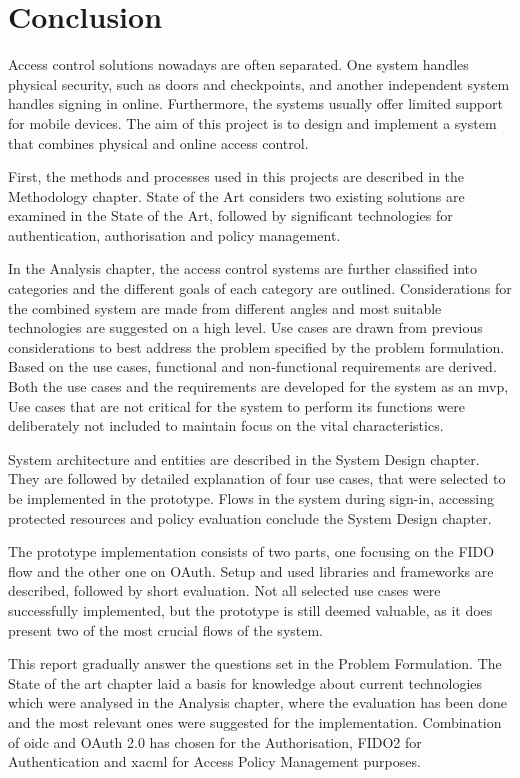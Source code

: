 \section{Conclusion}\label{sec:conclusion}

Access control solutions nowadays are often separated. One system handles physical security, such as doors and checkpoints, and another independent system handles signing in online. Furthermore, the systems usually offer limited support for mobile devices. The aim of this project is to design and implement a system that combines physical and online access control.

First, the methods and processes used in this projects are described in the Methodology chapter. State of the Art considers two existing solutions are examined in the State of the Art, followed by significant technologies for authentication, authorisation and policy management. 

In the Analysis chapter, the access control systems are further classified into categories and the different goals of each category are outlined. Considerations for the combined system are made from different angles and most suitable technologies are suggested on a high level. Use cases are drawn from previous considerations to best address the problem specified by the problem formulation. Based on the use cases, functional and non-functional requirements are derived. Both the use cases and the requirements are developed for the system as an \acrshort{mvp}, Use cases that are not critical for the system to perform its functions were deliberately not included to maintain focus on the vital characteristics.

System architecture and entities are described in the System Design chapter. They are followed by detailed explanation of four use cases, that were selected to be implemented in the prototype. Flows in the system during sign-in, accessing protected resources and policy evaluation conclude the System Design chapter.

The prototype implementation consists of two parts, one focusing on the FIDO flow and the other one on OAuth. Setup and used libraries and frameworks are described, followed by short evaluation. Not all selected use cases were successfully implemented, but the prototype is still deemed valuable, as it does present two of the most crucial flows of the system. 

This report gradually answer the questions set in the Problem Formulation. The State of the art chapter laid a basis for knowledge about current technologies which were analysed in the Analysis chapter, where the evaluation has been done and the most relevant ones were suggested for the implementation. Combination of \acrlong{oidc} and OAuth 2.0 has chosen for the Authorisation, FIDO2 for Authentication and \acrshort{xacml} for Access Policy Management purposes.

